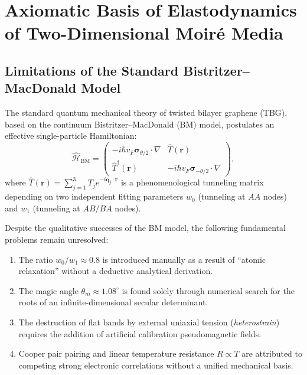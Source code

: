 \documentclass[12pt,a4paper]{article}
\begin{document}
	\newpage
	\tableofcontents
	\newpage
	
	\section{Axiomatic Basis of Elastodynamics of Two-Dimensional Moiré Media}
	
	\subsection{Limitations of the Standard Bistritzer--MacDonald Model}
	The standard quantum mechanical theory of twisted bilayer graphene (TBG), based on the continuum Bistritzer--MacDonald (BM) model, postulates an effective single-particle Hamiltonian:
	\begin{equation}
		\hat{\mathcal{H}}_{\text{BM}} = \begin{pmatrix} 
			-i \hbar v_F \boldsymbol{\sigma}_{\theta/2} \cdot \nabla & \hat{T}(\mathbf{r}) \\ 
			\hat{T}^\dagger(\mathbf{r}) & -i \hbar v_F \boldsymbol{\sigma}_{-\theta/2} \cdot \nabla 
		\end{pmatrix},
	\end{equation}
	where $\hat{T}(\mathbf{r}) = \sum_{j=1}^3 T_j e^{-i \mathbf{q}_j \cdot \mathbf{r}}$ is a phenomenological tunneling matrix depending on two independent fitting parameters $w_0$ (tunneling at $AA$ nodes) and $w_1$ (tunneling at $AB/BA$ nodes).
	
	Despite the qualitative successes of the BM model, the following fundamental problems remain unresolved:
	\begin{enumerate}
		\item The ratio $w_0/w_1 \approx 0.8$ is introduced manually as a result of ``atomic relaxation'' without a deductive analytical derivation.
		\item The magic angle $\theta_m \approx 1.08^\circ$ is found solely through numerical search for the roots of an infinite-dimensional secular determinant.
		\item The destruction of flat bands by external uniaxial tension (\textit{heterostrain}) requires the addition of artificial calibration pseudomagnetic fields.
		\item Cooper pair pairing and linear temperature resistance $R \propto T$ are attributed to competing strong electronic correlations without a unified mechanical basis.
	\end{enumerate}
	
\end{document}
